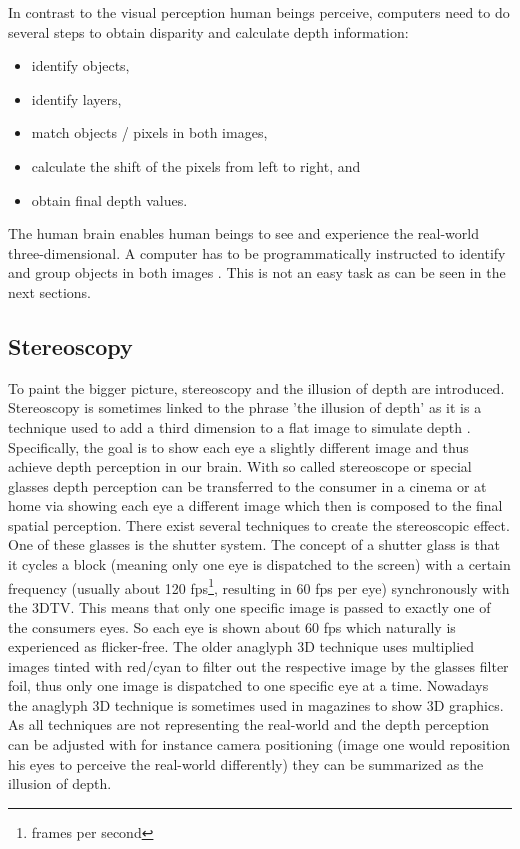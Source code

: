 \noindent In contrast to the visual perception human beings perceive, computers need to do several steps to obtain disparity and calculate depth information:

\begin{itemize}
  \item identify objects,
  \item identify layers,
  \item match objects / pixels in both images,
  \item calculate the shift of the pixels from left to right, and
  \item obtain final depth values.
\end{itemize}

\noindent The human brain enables human beings to see and experience the real-world three-dimensional.
A computer has to be programmatically instructed to identify and group objects in both images \citep{block20133d, cyganek2011introduction}.
This is not an easy task as can be seen in the next sections.

\subsection*{Stereoscopy}

To paint the bigger picture, stereoscopy and the illusion of depth are introduced.
Stereoscopy is sometimes linked to the phrase 'the illusion of depth' as it is a technique used to add a third dimension to a flat image to simulate depth \citep{block20133d, lucas20133d}.
Specifically, the goal is to show each eye a slightly different image and thus achieve depth perception in our brain.
With so called stereoscope or special glasses depth perception can be transferred to the consumer in a cinema or at home via showing each eye a different image which then is composed to the final spatial perception.
\newline\newline\noindent There exist several techniques to create the stereoscopic effect. One of these glasses is the shutter system.
The concept of a shutter glass is that it cycles a block (meaning only one eye is dispatched to the screen) with a certain frequency (usually about 120 fps\footnote{frames per second}, resulting in 60 fps per eye) synchronously with the 3DTV.
This means that only one specific image is passed to exactly one of the consumers eyes.
So each eye is shown about 60 fps which naturally is experienced as flicker-free.
The older anaglyph 3D technique uses multiplied images tinted with red/cyan to filter out the respective image by the glasses filter foil, thus only one image is dispatched to one specific eye at a time.
Nowadays the anaglyph 3D technique is sometimes used in magazines to show 3D graphics.
As all techniques are not representing the real-world and the depth perception can be adjusted with for instance camera positioning (image one would reposition his eyes to perceive the real-world differently) they can be summarized as the illusion of depth.

